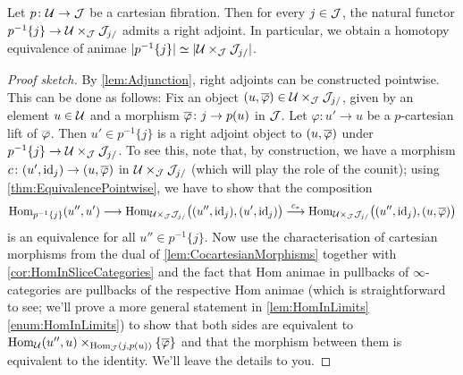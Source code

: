 \begin{lem}\label{lem:CartesianFibres}
	Let $p\colon \mathcal{U}\rightarrow \mathcal{J}$ be a cartesian fibration. Then for every $j\in\mathcal{J}$, the natural functor $p^{-1}\{j\}\rightarrow \mathcal{U}\times_{\mathcal{J}}\mathcal{J}_{j/}$ admits a right adjoint. In particular, we obtain a homotopy equivalence of animae $\abs{p^{-1}\{j\}}\simeq \abs{\Uu\times_\Jj\Jj_{j/}}$.
\end{lem}
\begin{proof}[Proof sketch]
	By \cref{lem:Adjunction}, right adjoints can be constructed pointwise. This can be done as follows: Fix an object $(u,\ov\varphi)\in \Uu\times_\Jj\Jj_{j/}$, given by an element $u\in \mathcal{U}$ and a morphism $\ov\varphi\colon j\rightarrow p(u)$ in $\mathcal{J}$. Let $\varphi\colon u'\rightarrow u$ be a $p$-cartesian lift of $\ov\varphi$. Then $u'\in p^{-1}\{j\}$ is a right adjoint object to $(u,\ov\varphi)$ under $p^{-1}\{j\}\rightarrow \mathcal{U}\times_{\mathcal{J}}\mathcal{J}_{j/}$. To see this, note that, by construction, we have a morphism $c\colon (u',\id_j)\rightarrow (u,\ov\varphi)$ in $\mathcal{U}\times_{\mathcal{J}}\mathcal{J}_{j/}$ (which will play the role of the counit); using \cref{thm:EquivalencePointwise}, we have to show that the composition
	\begin{equation*}
		\Hom_{p^{-1}\{j\}}(u'',u')\longrightarrow \Hom_{\Uu\times_\Jj\Jj_{j/}}\bigl((u'',\id_j),(u',\id_j)\bigr)\overset{c_*}{\longrightarrow}\Hom_{\Uu\times_\Jj\Jj_{j/}}\bigl((u'',\id_j),(u,\ov\varphi)\bigr)
	\end{equation*}
	is an equivalence for all $u''\in p^{-1}\{j\}$. Now use the characterisation of cartesian morphisms from the dual of \cref{lem:CocartesianMorphisms} together with \cref{cor:HomInSliceCategories} and the fact that Hom animae in pullbacks of $\infty$-categories are pullbacks of the respective Hom animae (which is straightforward to see; we'll prove a more general statement in \cref{lem:HomInLimits}\cref{enum:HomInLimits}) to show that both sides are equivalent to $\Hom_\Uu(u'',u)\times_{\Hom_\Jj(j,p(u))}\{\ov\varphi\}$ and that the morphism between them is equivalent to the identity. We'll leave the details to you.
\end{proof}

